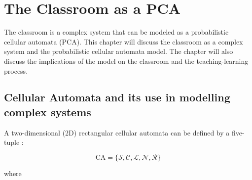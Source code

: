 \chapter{The Classroom as a PCA}
\hspace{\parindent} The classroom is a complex system that can be modeled as a probabilistic cellular automata (PCA). 
This chapter will discuss the classroom as a complex system and the probabilistic cellular automata model. 
The chapter will also discuss the implications of the model on the classroom and the teaching-learning process.

\section{Cellular Automata and its use in modelling complex systems}

A two-dimensional (2D) rectangular cellular automata can be defined by a five-tuple \cite{arciaga2009experimental, reinierMS}:

\begin{equation}
    \label{eq:CA definition}
    \text{CA} = \lbrace \mathcal{S,C,L,N,R} \rbrace
\end{equation}

where
\newcommand\itemS{\item[$\mathcal{S}=$]}
\newcommand\itemC{\item[$\mathcal{C}=$]}
\newcommand\itemL{\item[$\mathcal{L}=$]}
\newcommand\itemN{\item[$\mathcal{N}=$]}
\newcommand\itemR{\item[$\mathcal{R}=$]}

